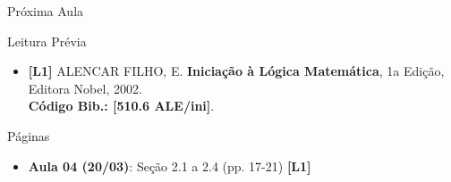 \documentclass[xcolor=dvipsnames,table]{beamer}
\begin{document}
 \begin{frame}{Próxima Aula}
     \begin{block}{Leitura Prévia}
         \begin{itemize}
             \item {\bf \color{blue} [L1]} ALENCAR FILHO, E. {\bf Iniciação à Lógica Matemática}, 1a Edição, Editora Nobel, 2002. \\{\color{blue} \bf Código Bib.: [510.6 ALE/ini]}.
         \end{itemize}
     \end{block}
     \begin{block}{Páginas}
         \begin{itemize}
         \item {\bf Aula 04 (20/03)}: Seção 2.1 a 2.4 (pp. 17-21) {\bf \color{blue} [L1]} 
         \end{itemize}
     \end{block}
 \end{frame}
	
	\begin{frame}
		\titlepage
	\end{frame}
	
\end{document}
